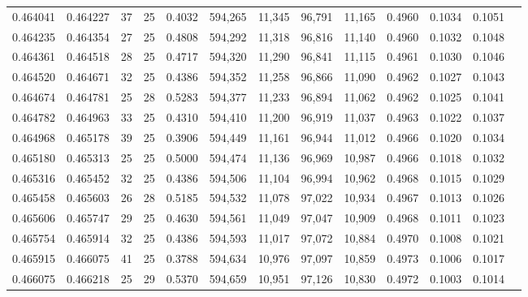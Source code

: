 \begin{tabular}{rrrrrrrrrrrrr}
0.464041 & 0.464227 &    37 &  25 &                                     0.4032 & 594,265 &  11,345 &  96,791 &  11,165 & 0.4960 & 0.1034 & 0.1051 \\
0.464235 & 0.464354 &    27 &  25 &                                     0.4808 & 594,292 &  11,318 &  96,816 &  11,140 & 0.4960 & 0.1032 & 0.1048 \\
0.464361 & 0.464518 &    28 &  25 &                                     0.4717 & 594,320 &  11,290 &  96,841 &  11,115 & 0.4961 & 0.1030 & 0.1046 \\
0.464520 & 0.464671 &    32 &  25 &                                     0.4386 & 594,352 &  11,258 &  96,866 &  11,090 & 0.4962 & 0.1027 & 0.1043 \\
0.464674 & 0.464781 &    25 &  28 &                                     0.5283 & 594,377 &  11,233 &  96,894 &  11,062 & 0.4962 & 0.1025 & 0.1041 \\
0.464782 & 0.464963 &    33 &  25 &                                     0.4310 & 594,410 &  11,200 &  96,919 &  11,037 & 0.4963 & 0.1022 & 0.1037 \\
0.464968 & 0.465178 &    39 &  25 &                                     0.3906 & 594,449 &  11,161 &  96,944 &  11,012 & 0.4966 & 0.1020 & 0.1034 \\
0.465180 & 0.465313 &    25 &  25 &                                     0.5000 & 594,474 &  11,136 &  96,969 &  10,987 & 0.4966 & 0.1018 & 0.1032 \\
0.465316 & 0.465452 &    32 &  25 &                                     0.4386 & 594,506 &  11,104 &  96,994 &  10,962 & 0.4968 & 0.1015 & 0.1029 \\
0.465458 & 0.465603 &    26 &  28 &                                     0.5185 & 594,532 &  11,078 &  97,022 &  10,934 & 0.4967 & 0.1013 & 0.1026 \\
0.465606 & 0.465747 &    29 &  25 &                                     0.4630 & 594,561 &  11,049 &  97,047 &  10,909 & 0.4968 & 0.1011 & 0.1023 \\
0.465754 & 0.465914 &    32 &  25 &                                     0.4386 & 594,593 &  11,017 &  97,072 &  10,884 & 0.4970 & 0.1008 & 0.1021 \\
0.465915 & 0.466075 &    41 &  25 &                                     0.3788 & 594,634 &  10,976 &  97,097 &  10,859 & 0.4973 & 0.1006 & 0.1017 \\
0.466075 & 0.466218 &    25 &  29 &                                     0.5370 & 594,659 &  10,951 &  97,126 &  10,830 & 0.4972 & 0.1003 & 0.1014 \\

\end{tabular}

